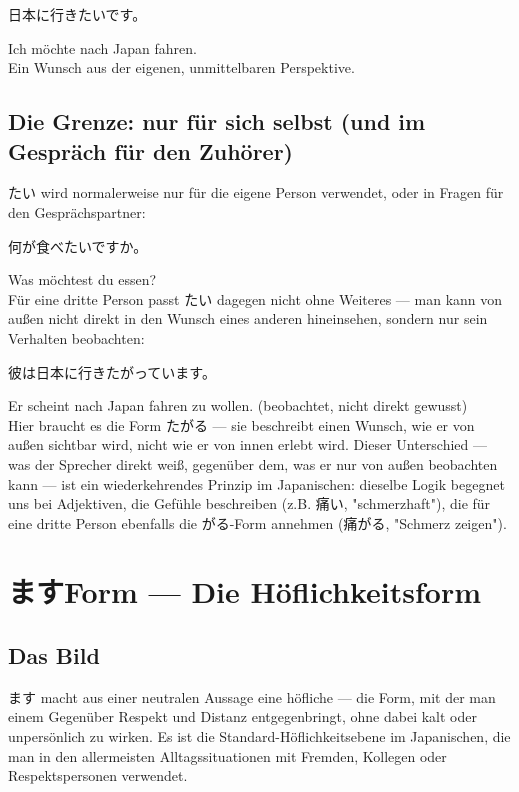 \documentclass[12pt]{book}
\begin{document}
\par\quad 日本に行きたいです。\\
\par\quad Ich möchte nach Japan fahren.\\

Ein Wunsch aus der eigenen, unmittelbaren Perspektive.

\section*{Die Grenze: nur für sich selbst (und im Gespräch für den Zuhörer)}

たい wird normalerweise nur für die eigene Person verwendet, oder in Fragen für den Gesprächspartner:

\par\quad 何が食べたいですか。\\
\par\quad Was möchtest du essen?\\

Für eine dritte Person passt たい dagegen nicht ohne Weiteres — man kann von außen nicht direkt in den Wunsch eines anderen hineinsehen, sondern nur sein Verhalten beobachten:

\par\quad 彼は日本に行きたがっています。\\
\par\quad Er scheint nach Japan fahren zu wollen. (beobachtet, nicht direkt gewusst)\\

Hier braucht es die Form たがる — sie beschreibt einen Wunsch, wie er von außen sichtbar wird, nicht wie er von innen erlebt wird. Dieser Unterschied — was der Sprecher direkt weiß, gegenüber dem, was er nur von außen beobachten kann — ist ein wiederkehrendes Prinzip im Japanischen: dieselbe Logik begegnet uns bei Adjektiven, die Gefühle beschreiben (z.B. 痛い, "schmerzhaft"), die für eine dritte Person ebenfalls die がる-Form annehmen (痛がる, "Schmerz zeigen").


\chapter{ますForm — Die Höflichkeitsform}

\section*{Das Bild}

ます macht aus einer neutralen Aussage eine höfliche — die Form, mit der man einem Gegenüber Respekt und Distanz entgegenbringt, ohne dabei kalt oder unpersönlich zu wirken. Es ist die Standard-Höflichkeitsebene im Japanischen, die man in den allermeisten Alltagssituationen mit Fremden, Kollegen oder Respektspersonen verwendet.
\end{document}
